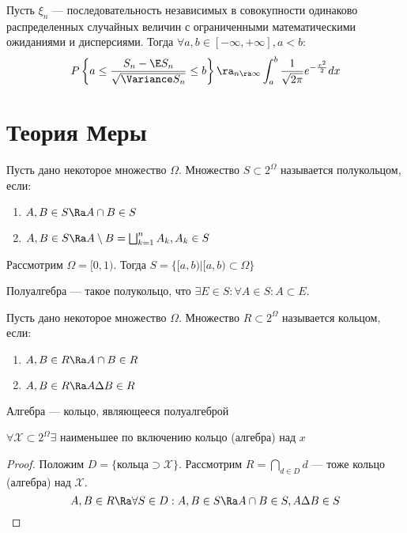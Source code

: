 \begin{theorem}
    Пусть \(\xi_n\) --- последовательность независимых в совокупности одинаково распределенных случайных величин с ограниченными математическими ожиданиями и дисперсиями. Тогда \(\forall a, b \in [-\infty, +\infty], a < b\):
    \[P\left\{a \le \frac{S_n - \E S_n}{\sqrt{\Variance S_n}}\le b\right\} \ra_{n \ra \infty} \int_a^b \frac{1}{\sqrt{2\pi}}e^{-\frac{x^2}{2}}dx\]
\end{theorem}

\section{Теория Меры}
\begin{definition}
    Пусть дано некоторое множество \(\Omega\). Множество \(S \subset 2^\Omega\) называется полукольцом, если:
    \begin{enumerate}
        \item \(A, B \in S \Ra A \cap B \in S\)
        \item \(A, B \in S \Ra A \setminus B = \bigsqcup_{k = 1}^n A_k, A_k \in S\)
    \end{enumerate}
\end{definition}

\begin{example}
    Рассмотрим \(\Omega = [0, 1)\). Тогда \(S = \{[a, b) | [a, b) \subset \Omega\}\)
\end{example}

\begin{definition}
    Полуалгебра --- такое полукольцо, что \(\exists E \in S: \forall A \in S: A \subset E\).
\end{definition}

\begin{definition}
    Пусть дано некоторое множество \(\Omega\). Множество \(R \subset 2^\Omega\) называется кольцом, если:
    \begin{enumerate}
        \item \(A, B \in R \Ra A \cap B \in R\)
        \item \(A, B \in R \Ra A \Delta B \in R\)
    \end{enumerate}
\end{definition}

\begin{definition}
    Алгебра --- кольцо, являющееся полуалгеброй
\end{definition}

\begin{proposition}
    \(\forall \mathcal{X} \subset 2^\Omega \exists\) наименьшее по включению кольцо (алгебра) над \(x\)
\end{proposition}
\begin{proof}
    Положим \(D = \{\text{кольца}\supset \mathcal{X}\}\). Рассмотрим
    \(R = \bigcap_{d \in D} d\) --- тоже кольцо (алгебра) над \(\mathcal{X}\).
    \[A, B \in R \Ra \forall S \in D: A, B \in S \Ra A \cap B \in S, A \Delta B \in S\]
\end{proof}

